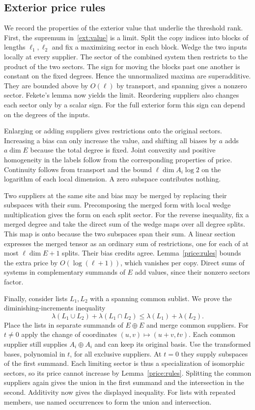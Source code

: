 \subsection{Exterior price rules}

We record the properties of the exterior value that underlie the
threshold rank. First, the supremum in~\eqref{ext:value} is a limit.
Split the copy indices into blocks of lengths $\ell_1,\ell_2$ and fix
a maximizing sector in each block. Wedge the two inputs locally at
every supplier. The sector of the combined system then restricts to
the product of the two sectors. The sign for moving the blocks past
one another is constant on the fixed degrees. Hence the unnormalized
maxima are superadditive. They are bounded above by $O(\ell)$ by
transport, and spanning gives a nonzero sector. Fekete's lemma now
yields the limit. Reordering suppliers also changes each sector only
by a scalar sign. For the full exterior form this sign can depend on
the degrees of the inputs.

Enlarging or adding suppliers gives restrictions onto the original
sectors. Increasing a bias can only increase the value, and shifting all biases
by $a$ adds $a\dim E$ because the total degree is fixed. Joint convexity
and positive homogeneity in the labels follow from the corresponding
properties of price. Continuity follows from transport and the bound
$\ell\dim A_i\log 2$ on the logarithm of each local dimension. A zero
subspace contributes nothing.

Two suppliers at the same site and bias may be merged by replacing their
subspaces with their sum. Precomposing the merged form with local
wedge multiplication gives the form on each split sector. For the reverse inequality, fix a
merged degree and take the direct sum of the wedge maps over all degree
splits. This map is onto because the two subspaces span their sum. A
linear section expresses the merged tensor as an ordinary sum of
restrictions, one for each of at most $\ell\dim E+1$ splits. Their
bias credits agree. Lemma~\ref{price:rules} bounds the extra price by
$O(\log(\ell+1))$, which vanishes per copy. Direct sums of systems in
complementary summands of $E$ add values, since their nonzero sectors
factor.

Finally, consider lists $L_1,L_2$ with a spanning common sublist.
We prove the diminishing-increments inequality
\[
 \lambda(L_1\cup L_2)+\lambda(L_1\cap L_2)
 \le \lambda(L_1)+\lambda(L_2).
\]
Place the lists in separate summands of $E\oplus E$ and merge common
suppliers. For $t\ne0$ apply the change of coordinates
$(u,v)\mapsto(u+v,tv)$. Each common supplier still supplies
$A_i\oplus A_i$ and can keep its original basis. Use the transformed
bases, polynomial in $t$, for all exclusive suppliers. At $t=0$ they
supply subspaces of the first summand. Each limiting sector is thus
a specialization of isomorphic sectors, so its price cannot increase
by Lemma~\ref{price:rules}. Splitting the common suppliers again gives
the union in the first summand and the intersection in the second.
Additivity now gives the displayed inequality. For lists with repeated
members, use named occurrences to form the union and intersection.
